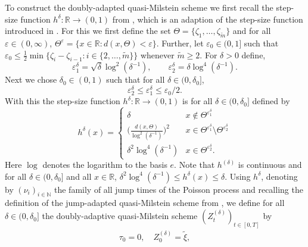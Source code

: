 \documentclass[11pt,a4paper]{article}
\numberwithin{equation}{section}
\theoremstyle{definition}
\newcommand{\N}{{\mathbb{N}}}
\newcommand{\R}{{\mathbb{R}}}
\begin{document}
To construct the doubly-adapted quasi-Milstein scheme we first recall the step-size function $h^\delta\colon \R\to (0,1)$ from \cite{Yaroslavtseva2022}, which is an adaption of the step-size function introduced in \cite{NSS19}. For this we first define the set $\Theta = \{\zeta_1,\ldots, \zeta_{\widetilde m}\}$ and for all $\varepsilon\in(0,\infty)$, $\Theta^\varepsilon = \{x\in\R: d(x,\Theta)<\varepsilon\}$. Further, let $\varepsilon_0 \in(0,1]$ such that $\varepsilon_0 \leq \frac{1}{2}\min\{\zeta_i -\zeta_{i-1} : i \in\{2,\ldots, \widetilde m\}\}$ whenever $\widetilde m \geq 2$. For $\delta > 0$ define, 
\begin{equation}
    \varepsilon_1^\delta = \sqrt{\delta}\log^2(\delta^{-1}), \quad\quad
    \varepsilon_2^\delta = \delta\log^4(\delta^{-1}).
\end{equation}
Next we chose $\delta_0\in(0,1)$ such that for all $\delta \in(0,\delta_0]$, 
\begin{equation}
    \varepsilon_2^\delta \leq \varepsilon_1^\delta \leq \varepsilon_0/2.
\end{equation}
With this the step-size function $h^\delta:\R\to(0,1)$ is for all $\delta \in(0,\delta_0]$ defined by
\begin{equation}
    h^\delta (x) = \left\{
\begin{array}{ll}
\delta & x\notin \Theta^{\varepsilon_1^\delta} \\
\Big(\frac{d(x,\Theta)}{\log^2(\delta^{-1})}\Big)^2 & x \in \Theta^{\varepsilon_1^\delta} \setminus \Theta^{\varepsilon_2^\delta}\\
\delta^2\log^4(\delta^{-1}) & x\in \Theta^{\varepsilon_2^\delta}.
\end{array}
\right.
\end{equation}
Here $\log$ denotes the logarithm to the basis $e$. Note that $h^{(\delta)}$ is continuous and for all $\delta\in(0,\delta_0]$ and all $x\in\R$, $\delta^2 \log^4(\delta^{-1})\leq h^{\delta}(x) \leq \delta$.  Using $h^\delta$, denoting by $(\nu_i)_{i\in\N}$ the family of all jump times of the Poisson process and recalling the definition of the jump-adapted quasi-Milstein scheme from \cite{PSS2024JMS}, we define for all $\delta\in(0,\delta_0]$ the doubly-adaptive quasi-Milstein scheme $(Z^{(\delta)}_t)_{t\in[0,T]}$ by
\begin{equation}\label{eqDefMS0}
\begin{aligned}
\tau_0 = 0, \quad Z^{(\delta)}_0 =\widetilde\xi,
\end{aligned}
\end{equation}
\end{document}
